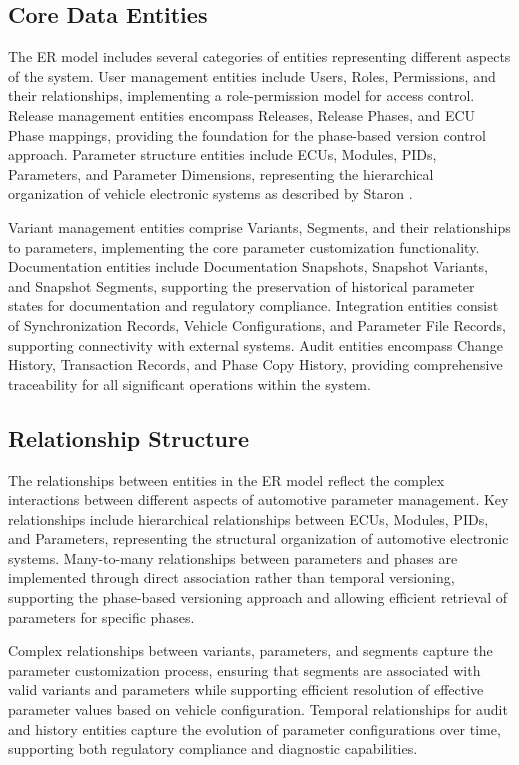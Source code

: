 \subsection{Core Data Entities}
\label{subsec:core-data-entities}

The \ac{ER} model includes several categories of entities representing different aspects of the system. User management entities include Users, Roles, Permissions, and their relationships, implementing a role-permission model for access control. Release management entities encompass Releases, Release Phases, and \ac{ECU} Phase mappings, providing the foundation for the phase-based version control approach. Parameter structure entities include \acp{ECU}, Modules, \acp{PID}, Parameters, and Parameter Dimensions, representing the hierarchical organization of vehicle electronic systems as described by Staron \cite{staron2021automotive}.

Variant management entities comprise Variants, Segments, and their relationships to parameters, implementing the core parameter customization functionality. Documentation entities include Documentation Snapshots, Snapshot Variants, and Snapshot Segments, supporting the preservation of historical parameter states for documentation and regulatory compliance. Integration entities consist of Synchronization Records, Vehicle Configurations, and Parameter File Records, supporting connectivity with external systems. Audit entities encompass Change History, Transaction Records, and Phase Copy History, providing comprehensive traceability for all significant operations within the system.

\subsection{Relationship Structure}
\label{subsec:relationship-structure}

The relationships between entities in the \ac{ER} model reflect the complex interactions between different aspects of automotive parameter management. Key relationships include hierarchical relationships between \acp{ECU}, Modules, \acp{PID}, and Parameters, representing the structural organization of automotive electronic systems. Many-to-many relationships between parameters and phases are implemented through direct association rather than temporal versioning, supporting the phase-based versioning approach and allowing efficient retrieval of parameters for specific phases.

Complex relationships between variants, parameters, and segments capture the parameter customization process, ensuring that segments are associated with valid variants and parameters while supporting efficient resolution of effective parameter values based on vehicle configuration. Temporal relationships for audit and history entities capture the evolution of parameter configurations over time, supporting both regulatory compliance and diagnostic capabilities.

